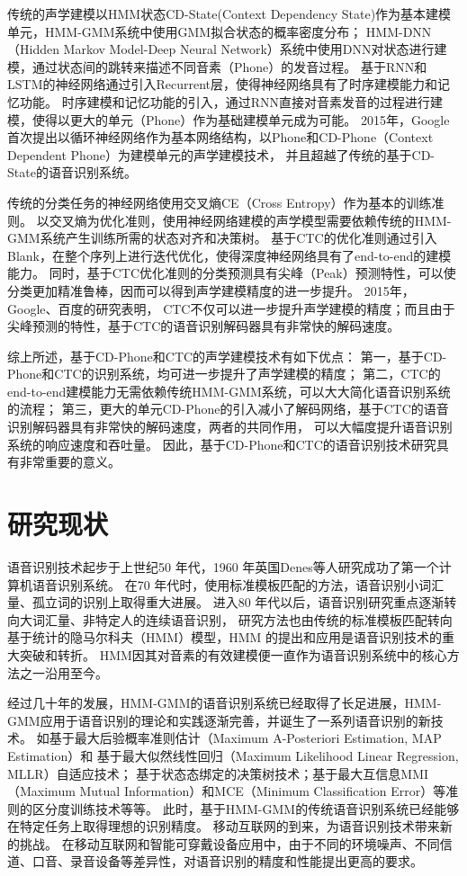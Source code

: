传统的声学建模以HMM状态CD-State(Context Dependency State)作为基本建模单元，HMM-GMM系统中使用GMM拟合状态的概率密度分布；
HMM-DNN（Hidden Markov Model-Deep Neural Network）系统中使用DNN对状态进行建模，通过状态间的跳转来描述不同音素（Phone）的发音过程。
基于RNN和LSTM的神经网络通过引入Recurrent层，使得神经网络具有了时序建模能力和记忆功能。
时序建模和记忆功能的引入，通过RNN直接对音素发音的过程进行建模，使得以更大的单元（Phone）作为基础建模单元成为可能。
2015年，Google首次提出以循环神经网络作为基本网络结构，以Phone和CD-Phone（Context Dependent Phone）为建模单元的声学建模技术，
并且超越了传统的基于CD-State的语音识别系统。

传统的分类任务的神经网络使用交叉熵CE（Cross Entropy）作为基本的训练准则。
以交叉熵为优化准则，使用神经网络建模的声学模型需要依赖传统的HMM-GMM系统产生训练所需的状态对齐和决策树。
基于CTC的优化准则通过引入Blank，在整个序列上进行迭代优化，使得深度神经网络具有了end-to-end的建模能力。
同时，基于CTC优化准则的分类预测具有尖峰（Peak）预测特性，可以使分类更加精准鲁棒，因而可以得到声学建模精度的进一步提升。
2015年，Google、百度的研究表明，
CTC不仅可以进一步提升声学建模的精度；而且由于尖峰预测的特性，基于CTC的语音识别解码器具有非常快的解码速度。

综上所述，基于CD-Phone和CTC的声学建模技术有如下优点：
第一，基于CD-Phone和CTC的识别系统，均可进一步提升了声学建模的精度；
第二，CTC的end-to-end建模能力无需依赖传统HMM-GMM系统，可以大大简化语音识别系统的流程；
第三，更大的单元CD-Phone的引入减小了解码网络，基于CTC的语音识别解码器具有非常快的解码速度，两者的共同作用，
可以大幅度提升语音识别系统的响应速度和吞吐量。
因此，基于CD-Phone和CTC的语音识别技术研究具有非常重要的意义。

\section{研究现状}

语音识别技术起步于上世纪50 年代，1960 年英国Denes等人研究成功了第一个计算机语音识别系统。
在70 年代时，使用标准模板匹配的方法，语音识别小词汇量、孤立词的识别上取得重大进展。
进入80 年代以后，语音识别研究重点逐渐转向大词汇量、非特定人的连续语音识别，
研究方法也由传统的标准模板匹配转向基于统计的隐马尔科夫（HMM）模型，HMM 的提出和应用是语音识别技术的重大突破和转折。
HMM因其对音素的有效建模便一直作为语音识别系统中的核心方法之一沿用至今。

经过几十年的发展，HMM-GMM的语音识别系统已经取得了长足进展，HMM-GMM应用于语音识别的理论和实践逐渐完善，并诞生了一系列语音识别的新技术。
如基于最大后验概率准则估计（Maximum A-Posteriori Estimation, MAP Estimation）和
基于最大似然线性回归（Maximum Likelihood Linear Regression, MLLR）自适应技术；
基于状态态绑定的决策树技术；基于最大互信息MMI（Maximum Mutual Information）和MCE（Minimum Classification Error）等准则的区分度训练技术等等。
此时，基于HMM-GMM的传统语音识别系统已经能够在特定任务上取得理想的识别精度。
移动互联网的到来，为语音识别技术带来新的挑战。
在移动互联网和智能可穿戴设备应用中，由于不同的环境噪声、不同信道、口音、录音设备等差异性，对语音识别的精度和性能提出更高的要求。

